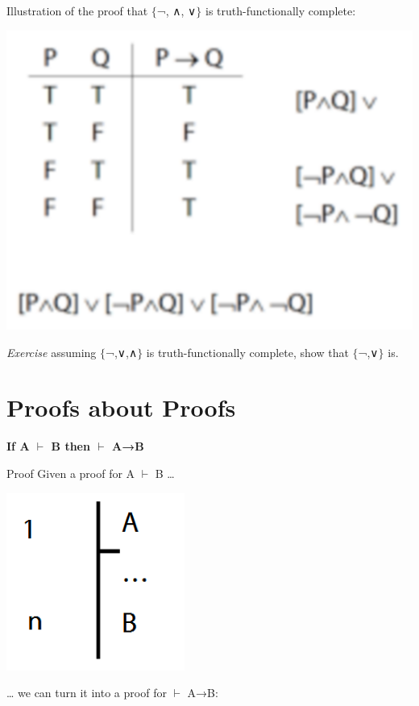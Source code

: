 \documentclass[12pt]{extarticle}
\begin{document}
\begin{multicols*}{3}
Illustration of the proof that $\{$¬, ∧, ∨$\}$ is truth-functionally complete:
 
\begin{center}
\includegraphics[scale=0.3]{img/unit_430_fig2.pdf}
\end{center}
\emph{Exercise} assuming $\{$¬,∨,∧$\}$ is truth-functionally complete, show that $\{$¬,∨$\}$ is.
 



\section{Proofs about Proofs}
 
\begin{minipage}{\columnwidth}
 
\textbf{If A $\vdash$ B then $\vdash$ A→B}
 
Proof Given a proof for A $\vdash$ B …
 
\begin{center}
\includegraphics[scale=0.3]{img/unit_440_a.png}
\end{center}
… we can turn it into a proof for $\vdash$ A→B:
 

\end{minipage}
\end{multicols*}
\end{document}
